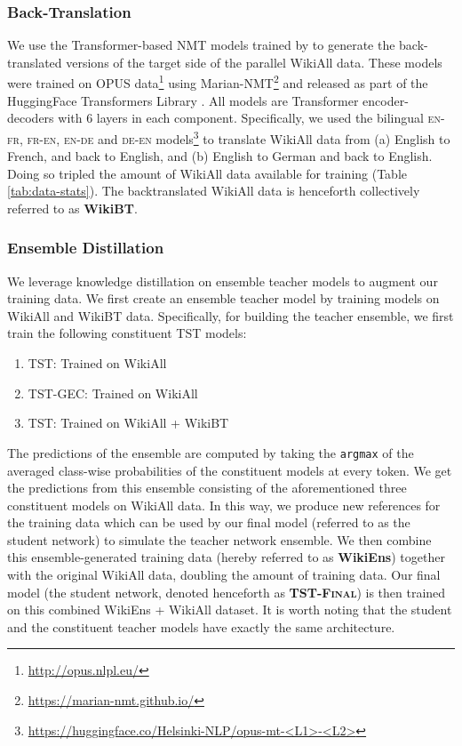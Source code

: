\documentclass[11pt,a4paper]{article}
\begin{document}
\subsubsection{Back-Translation}
We use the Transformer-based NMT models trained by \citet{TiedemannThottingal:EAMT2020} to generate the back-translated versions of the target side of the parallel WikiAll data. These models were trained on OPUS data\footnote{\url{http://opus.nlpl.eu/}} using Marian-NMT\footnote{\small{ \url{https://marian-nmt.github.io/}}} and released as part of the HuggingFace Transformers Library \cite{Wolf2019HuggingFacesTS}. All models are Transformer encoder-decoders with 6 layers in each component. Specifically, we used the bilingual \textsc{en-fr}, \textsc{fr-en}, \textsc{en-de} and \textsc{de-en} models\footnote{\small{\url{https://huggingface.co/Helsinki-NLP/opus-mt-<L1>-<L2>}}} to translate WikiAll data from (a) English to French, and back to English, and (b) English to German and back to English. Doing so tripled the amount of WikiAll data available for training (Table \ref{tab:data-stats}). The backtranslated WikiAll data is henceforth collectively referred to as \textbf{WikiBT}.

\subsubsection{Ensemble Distillation}
We leverage knowledge distillation on ensemble teacher models \cite{Freitag2017EnsembleDF} to augment our training data. We first create an ensemble teacher model by training models on WikiAll and WikiBT data. Specifically, for building the teacher ensemble, we first train the following constituent TST models:
\begin{enumerate}
\item \textsc{TST}: Trained on WikiAll
    \item \textsc{TST-GEC}: Trained on WikiAll
    \item \textsc{TST}: Trained on WikiAll + WikiBT
\end{enumerate}

The predictions of the ensemble are computed by taking the \texttt{argmax} of the averaged class-wise probabilities of the constituent models at every token. 
We get the predictions from this ensemble consisting of the aforementioned three constituent models on WikiAll data. In this way, we produce new references for the training data which can be used by our final model (referred to as the student network) to simulate the teacher network ensemble. 
We then combine this ensemble-generated training data (hereby referred to as \textbf{WikiEns}) together with the original WikiAll data, doubling the amount of training data.
Our final model (the student network, denoted henceforth as \textbf{\textsc{TST-Final}}) is then trained on this combined WikiEns + WikiAll dataset. 
It is worth noting that the student and the constituent teacher models have exactly the same architecture. 
\end{document}
